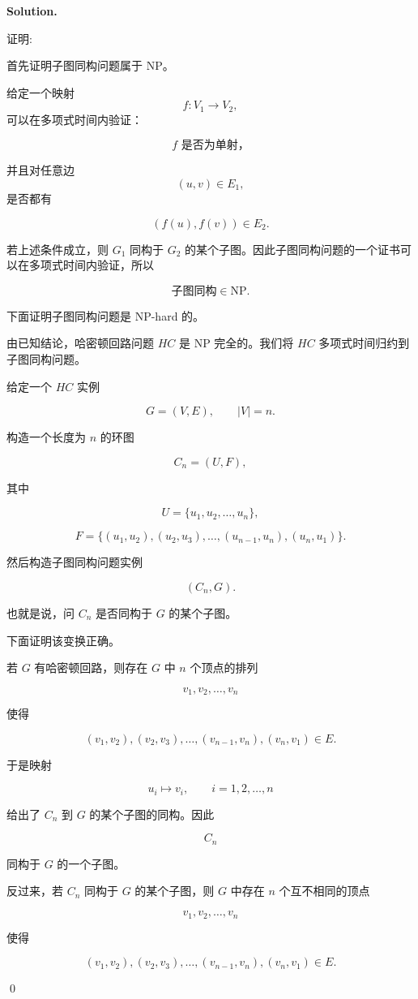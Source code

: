 \documentclass[11pt]{article}
\newenvironment{solution}{
\par\noindent\textbf{Solution.}\par\noindent
}{\qed}
\begin{document}
\begin{solution}
证明:

首先证明子图同构问题属于 NP。

给定一个映射
\[
f:V_1\to V_2,
\]
可以在多项式时间内验证：

\[
f \text{ 是否为单射，}
\]

并且对任意边
\[
(u,v)\in E_1,
\]
是否都有

\[
(f(u),f(v))\in E_2.
\]

若上述条件成立，则 \(G_1\) 同构于 \(G_2\) 的某个子图。因此子图同构问题的一个证书可以在多项式时间内验证，所以

\[
\text{子图同构}\in \mathrm{NP}.
\]

下面证明子图同构问题是 NP-hard 的。

由已知结论，哈密顿回路问题 \(HC\) 是 NP 完全的。我们将 \(HC\) 多项式时间归约到子图同构问题。

给定一个 \(HC\) 实例

\[
G=(V,E),
\qquad |V|=n.
\]

构造一个长度为 \(n\) 的环图

\[
C_n=(U,F),
\]

其中

\[
U=\{u_1,u_2,\ldots,u_n\},
\]

\[
F=\{(u_1,u_2),(u_2,u_3),\ldots,(u_{n-1},u_n),(u_n,u_1)\}.
\]

然后构造子图同构问题实例

\[
(C_n,G).
\]

也就是说，问 \(C_n\) 是否同构于 \(G\) 的某个子图。

下面证明该变换正确。

若 \(G\) 有哈密顿回路，则存在 \(G\) 中 \(n\) 个顶点的排列

\[
v_1,v_2,\ldots,v_n
\]

使得

\[
(v_1,v_2),(v_2,v_3),\ldots,(v_{n-1},v_n),(v_n,v_1)\in E.
\]

于是映射

\[
u_i\mapsto v_i,\qquad i=1,2,\ldots,n
\]

给出了 \(C_n\) 到 \(G\) 的某个子图的同构。因此

\[
C_n
\]

同构于 \(G\) 的一个子图。

反过来，若 \(C_n\) 同构于 \(G\) 的某个子图，则 \(G\) 中存在 \(n\) 个互不相同的顶点

\[
v_1,v_2,\ldots,v_n
\]

使得

\[
(v_1,v_2),(v_2,v_3),\ldots,(v_{n-1},v_n),(v_n,v_1)\in E.
\]


\end{solution}
\end{document}
